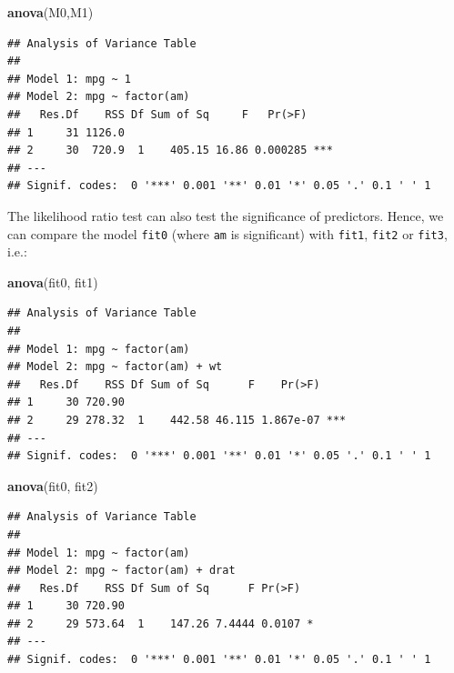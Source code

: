 \documentclass[]{article}
\newenvironment{Shaded}{\begin{snugshade}}{\end{snugshade}}
\newcommand{\KeywordTok}[1]{\textcolor[rgb]{0.13,0.29,0.53}{\textbf{{#1}}}}
\newcommand{\NormalTok}[1]{{#1}}
\numberwithin{equation}{section}
\begin{document}
\begin{Shaded}
\begin{Highlighting}[]
\KeywordTok{anova}\NormalTok{(M0,M1)}
\end{Highlighting}
\end{Shaded}

\begin{verbatim}
## Analysis of Variance Table
## 
## Model 1: mpg ~ 1
## Model 2: mpg ~ factor(am)
##   Res.Df    RSS Df Sum of Sq     F   Pr(>F)    
## 1     31 1126.0                                
## 2     30  720.9  1    405.15 16.86 0.000285 ***
## ---
## Signif. codes:  0 '***' 0.001 '**' 0.01 '*' 0.05 '.' 0.1 ' ' 1
\end{verbatim}

The likelihood ratio test can also test the significance of predictors.
Hence, we can compare the model \texttt{fit0} (where \texttt{am} is
significant) with \texttt{fit1}, \texttt{fit2} or \texttt{fit3}, i.e.:

\begin{Shaded}
\begin{Highlighting}[]
\KeywordTok{anova}\NormalTok{(fit0, fit1)}
\end{Highlighting}
\end{Shaded}

\begin{verbatim}
## Analysis of Variance Table
## 
## Model 1: mpg ~ factor(am)
## Model 2: mpg ~ factor(am) + wt
##   Res.Df    RSS Df Sum of Sq      F    Pr(>F)    
## 1     30 720.90                                  
## 2     29 278.32  1    442.58 46.115 1.867e-07 ***
## ---
## Signif. codes:  0 '***' 0.001 '**' 0.01 '*' 0.05 '.' 0.1 ' ' 1
\end{verbatim}

\begin{Shaded}
\begin{Highlighting}[]
\KeywordTok{anova}\NormalTok{(fit0, fit2)}
\end{Highlighting}
\end{Shaded}

\begin{verbatim}
## Analysis of Variance Table
## 
## Model 1: mpg ~ factor(am)
## Model 2: mpg ~ factor(am) + drat
##   Res.Df    RSS Df Sum of Sq      F Pr(>F)  
## 1     30 720.90                             
## 2     29 573.64  1    147.26 7.4444 0.0107 *
## ---
## Signif. codes:  0 '***' 0.001 '**' 0.01 '*' 0.05 '.' 0.1 ' ' 1
\end{verbatim}
\end{document}
